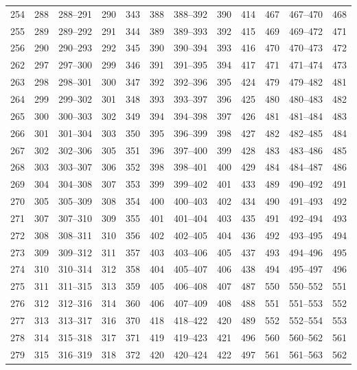 \begin{longtable}{rrcr|rrcr|rrcr}
254 & 288 & 288--291 & 290 & 343 & 388 & 388--392 & 390 & 414 & 467 & 467--470 & 468 \\
255 & 289 & 289--292 & 291 & 344 & 389 & 389--393 & 392 & 415 & 469 & 469--472 & 471 \\
256 & 290 & 290--293 & 292 & 345 & 390 & 390--394 & 393 & 416 & 470 & 470--473 & 472 \\
262 & 297 & 297--300 & 299 & 346 & 391 & 391--395 & 394 & 417 & 471 & 471--474 & 473 \\
263 & 298 & 298--301 & 300 & 347 & 392 & 392--396 & 395 & 424 & 479 & 479--482 & 481 \\
264 & 299 & 299--302 & 301 & 348 & 393 & 393--397 & 396 & 425 & 480 & 480--483 & 482 \\
265 & 300 & 300--303 & 302 & 349 & 394 & 394--398 & 397 & 426 & 481 & 481--484 & 483 \\
266 & 301 & 301--304 & 303 & 350 & 395 & 396--399 & 398 & 427 & 482 & 482--485 & 484 \\
267 & 302 & 302--306 & 305 & 351 & 396 & 397--400 & 399 & 428 & 483 & 483--486 & 485 \\
268 & 303 & 303--307 & 306 & 352 & 398 & 398--401 & 400 & 429 & 484 & 484--487 & 486 \\
269 & 304 & 304--308 & 307 & 353 & 399 & 399--402 & 401 & 433 & 489 & 490--492 & 491 \\
270 & 305 & 305--309 & 308 & 354 & 400 & 400--403 & 402 & 434 & 490 & 491--493 & 492 \\
271 & 307 & 307--310 & 309 & 355 & 401 & 401--404 & 403 & 435 & 491 & 492--494 & 493 \\
272 & 308 & 308--311 & 310 & 356 & 402 & 402--405 & 404 & 436 & 492 & 493--495 & 494 \\
273 & 309 & 309--312 & 311 & 357 & 403 & 403--406 & 405 & 437 & 493 & 494--496 & 495 \\
274 & 310 & 310--314 & 312 & 358 & 404 & 405--407 & 406 & 438 & 494 & 495--497 & 496 \\
275 & 311 & 311--315 & 313 & 359 & 405 & 406--408 & 407 & 487 & 550 & 550--552 & 551 \\
276 & 312 & 312--316 & 314 & 360 & 406 & 407--409 & 408 & 488 & 551 & 551--553 & 552 \\
277 & 313 & 313--317 & 316 & 370 & 418 & 418--422 & 420 & 489 & 552 & 552--554 & 553 \\
278 & 314 & 315--318 & 317 & 371 & 419 & 419--423 & 421 & 496 & 560 & 560--562 & 561 \\
279 & 315 & 316--319 & 318 & 372 & 420 & 420--424 & 422 & 497 & 561 & 561--563 & 562 \\

\end{longtable}
